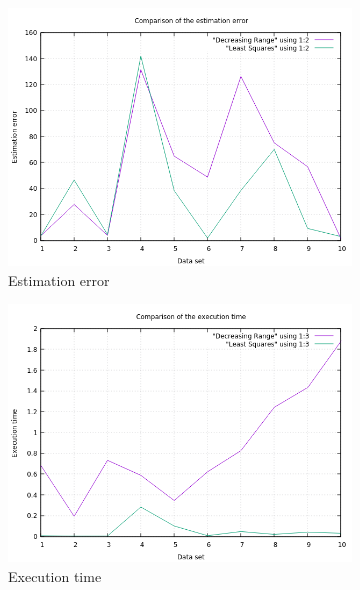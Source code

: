 \begin{figure}[!htb]
	\begin{subfigure}[b]{0.5\textwidth}
		\includegraphics[width=\linewidth]{images/results/comparisonErrorsDRLS.png}
		\caption{Estimation error}
	\end{subfigure}
	\hfill
	\begin{subfigure}[b]{0.5\textwidth}
		\includegraphics[width=\linewidth]{images/results/comparisonTimeDRLS.png}
		\caption{Execution time}
	\end{subfigure}
	\hfill
	\begin{subfigure}[b]{0.5\textwidth}

\end{subfigure}
\end{figure}
